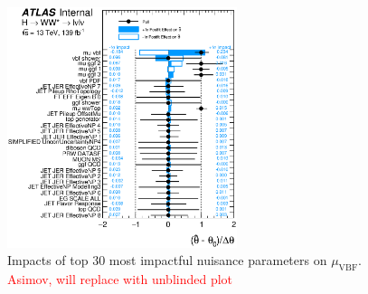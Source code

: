 \begin{figure}[!h]
\centering
      \includegraphics[width=0.6\textwidth]{Pictures/fitresults/impact_asimov_mu_vbf.eps}
{\caption{Impacts of top 30 most impactful nuisance parameters on $\mu_{\text{VBF}}$. \textcolor{red}{Asimov, will replace with unblinded plot}
\label{fig:impacts}}}
\end{figure}

